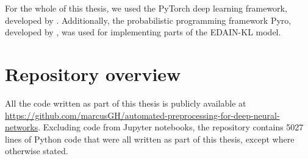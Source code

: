 \documentclass{statsmsc}
\begin{document}
{For the whole of this thesis, we used the PyTorch deep learning framework,
developed by \cite{pytorch}. Additionally, the probabilistic programming framework Pyro,
developed by \cite{pyro}, was used for implementing parts of the \ac{EDAIN-KL} model.

\section{Repository overview}%
\label{sec:Repository overview}

All the code written as part of this thesis is publicly available at
\url{https://github.com/marcusGH/automated-preprocessing-for-deep-neural-networks}. Excluding
code from Jupyter notebooks, the repository contains 5027 lines of Python code that were all
written as part of this thesis, except where otherwise stated.

}
\end{document}
